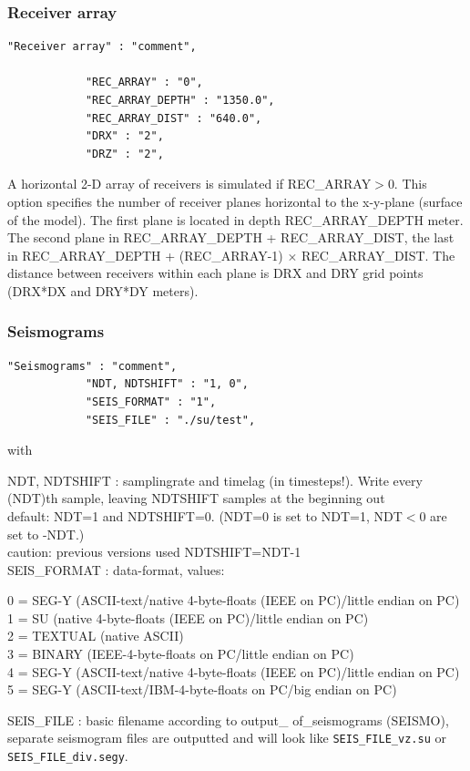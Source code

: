 \documentclass[11pt,onecolumn,oneside]{article}
\begin{document}
\subsubsection{Receiver array}
\begin{verbatim}
"Receiver array" : "comment",

			"REC_ARRAY" : "0",
			"REC_ARRAY_DEPTH" : "1350.0",
			"REC_ARRAY_DIST" : "640.0", 
			"DRX" : "2",
			"DRZ" : "2",
\end{verbatim}

A horizontal 2-D array of receivers is simulated if REC\_ARRAY$>$0. This option specifies the number of receiver planes horizontal to the x-y-plane (surface of the model). The first plane is located in depth REC\_ARRAY\_DEPTH meter. The second plane in REC\_ARRAY\_DEPTH + REC\_ARRAY\_DIST, the last in REC\_ARRAY\_DEPTH + (REC\_ARRAY-1) $\times$ REC\_ARRAY\_DIST. The distance between receivers within each plane is DRX and DRY grid points (DRX*DX and DRY*DY meters).

\subsubsection{Seismograms}
\label{seismograms}
\begin{verbatim}
"Seismograms" : "comment",
			"NDT, NDTSHIFT" : "1, 0",
			"SEIS_FORMAT" : "1",
			"SEIS_FILE" : "./su/test",
\end{verbatim}

with

NDT, NDTSHIFT : samplingrate and timelag (in timesteps!). Write every (NDT)th sample, leaving NDTSHIFT samples at the beginning out\\
default: NDT=1 and NDTSHIFT=0. (NDT=0 is set to NDT=1, NDT$<$0 are set to -NDT.)\\
caution: previous versions used NDTSHIFT=NDT-1\\
SEIS\_FORMAT : data-format, values:
\par
\begingroup
\leftskip=0.5cm
0 = SEG-Y (ASCII-text/native 4-byte-floats (IEEE on PC)/little endian on PC)\\
1 = SU (native 4-byte-floats (IEEE on PC)/little endian on PC)\\
2 = TEXTUAL (native ASCII)\\
3 = BINARY (IEEE-4-byte-floats on PC/little endian on PC)\\
4 = SEG-Y (ASCII-text/native 4-byte-floats (IEEE on PC)/little endian on PC)\\
5 = SEG-Y (ASCII-text/IBM-4-byte-floats on PC/big endian on PC) \\
\par
\endgroup
SEIS\_FILE : basic filename according to output\_ of\_seismograms (SEISMO), separate seismogram files are outputted and will look like  \lstinline{SEIS_FILE_vz.su} or  \lstinline{SEIS_FILE_div.segy}.
\end{document}
